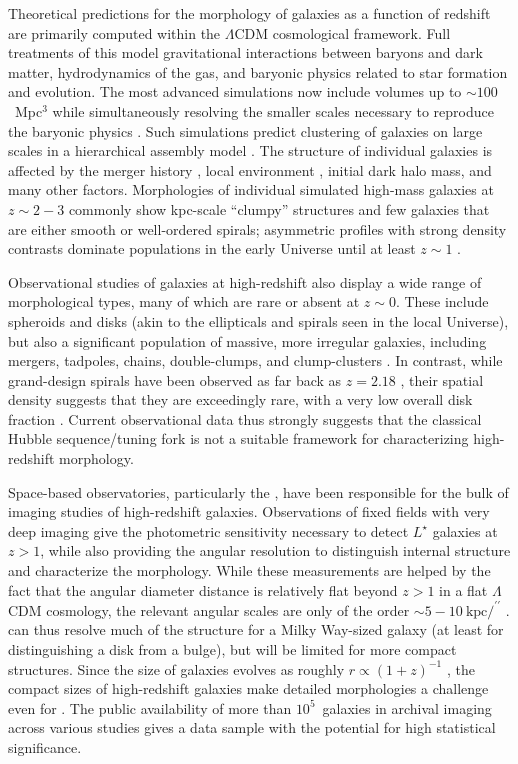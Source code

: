 \documentclass[twocolumn]{aastex6}
\begin{document}
Theoretical predictions for the morphology of galaxies as a function of redshift are primarily computed within the $\Lambda$CDM cosmological framework. Full treatments of this model gravitational interactions between baryons and dark matter, hydrodynamics of the gas, and baryonic physics related to star formation and evolution. The most advanced simulations now include volumes up to $\sim100$~Mpc$^3$ while simultaneously resolving the smaller scales necessary to reproduce the baryonic physics \citep{vog14a,sch15}. Such simulations predict clustering of galaxies on large scales in a hierarchical assembly model \citep{sil12}. The structure of individual galaxies is affected by the merger history \citep{too72,hop10}, local environment \citep[such as the morphology-density relation;][]{dre80}, initial dark halo mass, and many other factors. Morphologies of individual simulated high-mass galaxies at $z\sim2-3$ commonly show kpc-scale ``clumpy'' structures and few galaxies that are either smooth or well-ordered spirals; asymmetric profiles with strong density contrasts dominate populations in the early Universe until at least $z\sim1$ \citep{gen14}. 

Observational studies of galaxies at high-redshift also display a wide range of morphological types, many of which are rare or absent at $z\sim0$. These include spheroids and disks (akin to the ellipticals and spirals seen in the local Universe), but also a significant population of massive, more irregular galaxies, including mergers, tadpoles, chains, double-clumps, and clump-clusters \citep{elm05,elm07,cam11a,for11a,kar15}. In contrast, while grand-design spirals have been observed as far back as $z=2.18$ \citep{law12}, their spatial density suggests that they are exceedingly rare, with a very low overall disk fraction \citep{mor13}. Current observational data thus strongly suggests that the classical Hubble sequence/tuning fork \citep{hub36} is not a suitable framework for characterizing high-redshift morphology. 

Space-based observatories, particularly the \hubble, have been responsible for the bulk of imaging studies of high-redshift galaxies. Observations of fixed fields with very deep imaging \citep[eg,][]{wil96,gia04,bec06,dav07,sco07,gro11} give the photometric sensitivity necessary to detect $L^\star$ galaxies at $z>1$, while also providing the angular resolution to distinguish internal structure and characterize the morphology. While these measurements are helped by the fact that the angular diameter distance is relatively flat beyond $z>1$ in a flat $\Lambda$CDM cosmology, the relevant angular scales are only of the order $\sim5-10~\mathrm{kpc}/^{\prime\prime}$ \citep{wri06}. \hst{} can thus resolve much of the structure for a Milky Way-sized galaxy (at least for distinguishing a disk from a bulge), but will be limited for more compact structures. Since the size of galaxies evolves as roughly $r\propto(1+z)^{-1}$ \citep{law12a}, the compact sizes of high-redshift galaxies make detailed morphologies a challenge even for \hst{} \citep{che12}. The public availability of more than $10^5$~galaxies in archival imaging across various studies gives a data sample with the potential for high statistical significance. 
\end{document}
